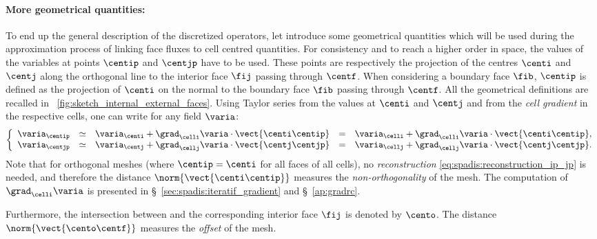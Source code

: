  \paragraph{More geometrical quantities:}
To end up the general description of the discretized operators, let introduce some geometrical 
quantities which will be used during the approximation process of linking face fluxes to 
cell centred quantities. 
For consistency and to reach a higher order in space, the values of the
variables at points $\centip$ and $\centjp$ have to be used. 
These points are respectively the projection of the centres $\centi$ and $\centj$ 
along the orthogonal line to the interior face $\fij$ passing through $\centf$. 
When considering a boundary face $\fib$, $\centip$ is defined as the projection of $\centi$
on the normal to the boundary face $\fib$ passing through $\centf$. All the geometrical
definitions are recalled in \figurename~\ref{fig:sketch_internal_external_faces}.
%
Using Taylor series from the values at $\centi$ and $\centj$ and from the \emph{cell gradient}
in the respective cells, one can write for any field $\varia$:
\begin{equation}\label{eq:spadis:reconstruction_ip_jp}
\left\lbrace
\begin{array}{r c l c l}
\varia_\centip &\simeq & \varia_\centi + \grad_\celli \varia \cdot \vect{\centi \centip} &=& \varia_\celli + \grad_\celli \varia \cdot \vect{\centi \centip},  \\
\varia_\centjp &\simeq & \varia_\centj + \grad_\cellj \varia \cdot \vect{\centj \centjp} & =& \varia_\cellj + \grad_\cellj \varia \cdot \vect{\centj \centjp}. 
\end{array}
\right.
\end{equation}
Note that for orthogonal meshes (where $\centip = \centi$ for all faces of all cells), 
no \emph{reconstruction} \eqref{eq:spadis:reconstruction_ip_jp} is needed, 
and therefore the distance $\norm{\vect{\centi \centip}}$ measures the \emph{non-orthogonality} of the mesh.
The computation of $\grad_\celli \varia$ is presented in  \S~\ref{sec:spadis:iteratif_gradient} and \S~\ref{ap:gradrc}.

Furthermore, the intersection between \vect{\centi \centj} and the corresponding interior face $\fij$ is denoted by $\cento$. 
The distance $\norm{\vect{\cento \centf}}$ measures the \emph{offset} of the mesh. 

